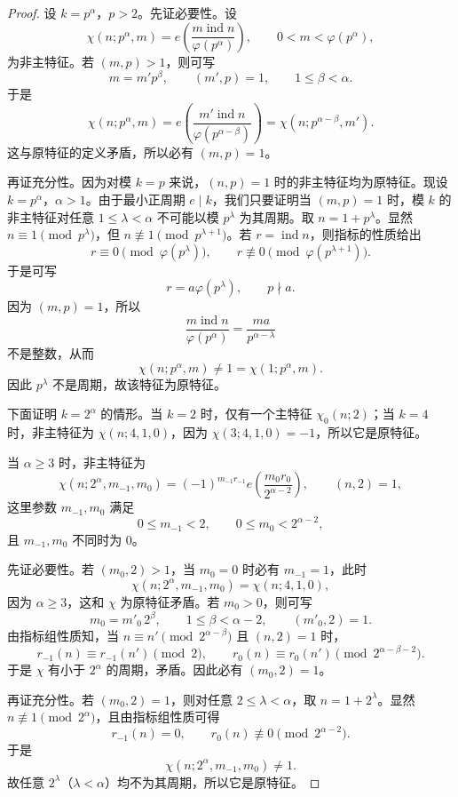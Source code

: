\begin{proof}
	设 $k=p^\alpha$，$p>2$。先证必要性。设
	\[
		\chi(n;p^\alpha,m)
		=
		e\left(\frac{m\operatorname{ind}n}{\varphi(p^\alpha)}\right),
		\qquad 0<m<\varphi(p^\alpha),
	\]
	为非主特征。若 $(m,p)>1$，则可写
	\[
		m=m'p^\beta,\qquad (m',p)=1,\qquad 1\leq\beta<\alpha.
	\]
	于是
	\[
		\chi(n;p^\alpha,m)
		=
		e\left(\frac{m'\operatorname{ind}n}{\varphi(p^{\alpha-\beta})}\right)
		=
		\chi(n;p^{\alpha-\beta},m').
	\]
	这与原特征的定义矛盾，所以必有 $(m,p)=1$。

	再证充分性。因为对模 $k=p$ 来说，$(n,p)=1$ 时的非主特征均为原特征。现设 $k=p^\alpha$，$\alpha>1$。由于最小正周期 $e\mid k$，我们只要证明当 $(m,p)=1$ 时，模 $k$ 的非主特征对任意 $1\leq\lambda<\alpha$ 不可能以模 $p^\lambda$ 为其周期。取 $n=1+p^\lambda$。显然 $n\equiv1\pmod {p^\lambda}$，但 $n\not\equiv1\pmod {p^{\lambda+1}}$。若 $r=\operatorname{ind}n$，则指标的性质给出
	\[
		r\equiv0\pmod {\varphi(p^\lambda)},\qquad
		r\not\equiv0\pmod {\varphi(p^{\lambda+1})}.
	\]
	于是可写
	\[
		r=a\varphi(p^\lambda),\qquad p\nmid a.
	\]
	因为 $(m,p)=1$，所以
	\[
		\frac{m\operatorname{ind}n}{\varphi(p^\alpha)}
		=
		\frac{ma}{p^{\alpha-\lambda}}
	\]
	不是整数，从而
	\[
		\chi(n;p^\alpha,m)\neq1=\chi(1;p^\alpha,m).
	\]
	因此 $p^\lambda$ 不是周期，故该特征为原特征。

	下面证明 $k=2^\alpha$ 的情形。当 $k=2$ 时，仅有一个主特征 $\chi_0(n;2)$；当 $k=4$ 时，非主特征为 $\chi(n;4,1,0)$，因为 $\chi(3;4,1,0)=-1$，所以它是原特征。

	当 $\alpha\geq 3$ 时，非主特征为
	\[
		\chi(n;2^\alpha,m_{-1},m_0)
		=
		(-1)^{m_{-1}r_{-1}}
		e\left(\frac{m_0r_0}{2^{\alpha-2}}\right),
		\qquad (n,2)=1,
	\]
	这里参数 $m_{-1},m_0$ 满足
	\[
		0\leq m_{-1}<2,\qquad 0\leq m_0<2^{\alpha-2},
	\]
	且 $m_{-1},m_0$ 不同时为 $0$。

	先证必要性。若 $(m_0,2)>1$，当 $m_0=0$ 时必有 $m_{-1}=1$，此时
	\[
		\chi(n;2^\alpha,m_{-1},m_0)=\chi(n;4,1,0),
	\]
	因为 $\alpha\geq3$，这和 $\chi$ 为原特征矛盾。若 $m_0>0$，则可写
	\[
		m_0=m'_0\,2^\beta,\qquad 1\leq\beta<\alpha-2,\qquad (m'_0,2)=1.
	\]
	由指标组性质知，当 $n\equiv n'\pmod {2^{\alpha-\beta}}$ 且 $(n,2)=1$ 时，
	\[
		r_{-1}(n)\equiv r_{-1}(n')\pmod 2,\qquad
		r_0(n)\equiv r_0(n')\pmod {2^{\alpha-\beta-2}}.
	\]
	于是 $\chi$ 有小于 $2^\alpha$ 的周期，矛盾。因此必有 $(m_0,2)=1$。

	再证充分性。若 $(m_0,2)=1$，则对任意 $2\leq\lambda<\alpha$，取 $n=1+2^\lambda$。显然 $n\not\equiv1\pmod {2^\alpha}$，且由指标组性质可得
	\[
		r_{-1}(n)=0,\qquad r_0(n)\not\equiv0\pmod {2^{\alpha-2}}.
	\]
	于是
	\[
		\chi(n;2^\alpha,m_{-1},m_0)\neq1.
	\]
	故任意 $2^\lambda$（$\lambda<\alpha$）均不为其周期，所以它是原特征。
\end{proof}

